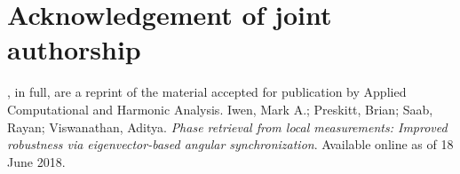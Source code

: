 \section*{Acknowledgement of joint authorship}

, in full, are a reprint of the material accepted for publication by Applied Computational and Harmonic Analysis.  Iwen, Mark A.; Preskitt, Brian; Saab, Rayan; Viswanathan, Aditya.  \emph{Phase retrieval from local measurements: Improved robustness via eigenvector-based angular synchronization}.  Available online as of 18 June 2018.
